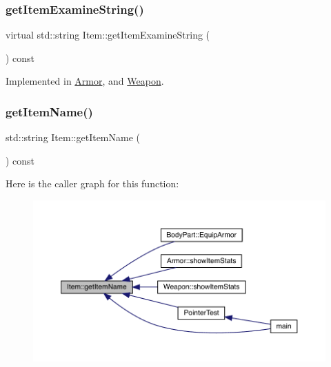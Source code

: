 \subsubsection{\texorpdfstring{get\+Item\+Examine\+String()}{getItemExamineString()}}
{\footnotesize\ttfamily virtual std\+::string Item\+::get\+Item\+Examine\+String (\begin{DoxyParamCaption}{ }\end{DoxyParamCaption}) const\hspace{0.3cm}{\ttfamily [pure virtual]}}



Implemented in \mbox{\hyperlink{class_armor_a731bb4d1fe53070f30a336db82fada2c}{Armor}}, and \mbox{\hyperlink{class_weapon_aa52cecf0a3c34aba70a6425c36d40afa}{Weapon}}.

\mbox{\label{class_item_a806159273f1f9fbb07fe75a74f2f51c5}} 
\subsubsection{\texorpdfstring{get\+Item\+Name()}{getItemName()}}
{\footnotesize\ttfamily std\+::string Item\+::get\+Item\+Name (\begin{DoxyParamCaption}{ }\end{DoxyParamCaption}) const}

Here is the caller graph for this function\+:
\nopagebreak
\begin{figure}[H]
\begin{center}
\leavevmode
\includegraphics[width=350pt]{class_item_a806159273f1f9fbb07fe75a74f2f51c5_icgraph}
\end{center}
\end{figure}
\mbox{\label{class_item_a452c0983b99f1b148949274b63ed79fd}} 
